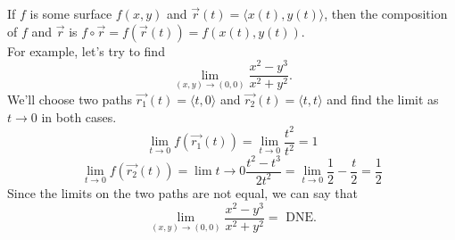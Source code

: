 \noindent
If $f$ is some surface $f(x, y)$ and $\vec{r}(t) = \langle x(t), y(t)\rangle$, then the composition of $f$ and $\vec{r}$ is $f\circ\vec{r} = f(\vec{r}(t)) = f(x(t), y(t))$.\\
For example, let's try to find
\begin{equation*}
	\lim_{(x,y) \to (0,0)}{\frac{x^2-y^3}{x^2+y^2}}.
\end{equation*}
\indent
We'll choose two paths $\vec{r_1}(t) = \langle t, 0 \rangle$ and $\vec{r_2}(t) = \langle t, t \rangle$ and find the limit as $t \to 0$ in both cases.\\
\indent
\begin{equation*}
	\lim_{t \to 0}{f(\vec{r_1}(t))} = \lim_{t \to 0}{\frac{t^2}{t^2}} = 1
\end{equation*}
\indent
\begin{equation*}
	\lim_{t \to 0}{f(\vec{r_2}(t))} = \lim{t \to 0}{\frac{t^2-t^3}{2t^2}} = \lim_{t \to 0}{\frac{1}{2} - \frac{t}{2}} = \frac{1}{2}
\end{equation*}
\indent
Since the limits on the two paths are not equal, we can say that
\begin{equation*}
	\lim_{(x,y) \to (0,0)}{\frac{x^2-y^3}{x^2+y^2}} = \text{ DNE}.
\end{equation*}